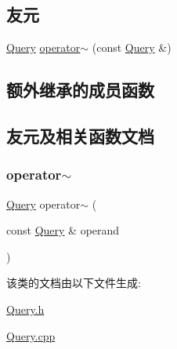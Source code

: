 \subsection*{友元}
\begin{DoxyCompactItemize}
\item 
\hyperlink{classQuery}{Query} \hyperlink{classNotQuery_afa815c3d9f1296e687770014302bac9a}{operator$\sim$} (const \hyperlink{classQuery}{Query} \&)
\end{DoxyCompactItemize}
\subsection*{额外继承的成员函数}


\subsection{友元及相关函数文档}
\mbox{\label{classNotQuery_afa815c3d9f1296e687770014302bac9a}} 
\subsubsection{\texorpdfstring{operator$\sim$}{operator~}}
{\footnotesize\ttfamily \hyperlink{classQuery}{Query} operator$\sim$ (\begin{DoxyParamCaption}\item[{const \hyperlink{classQuery}{Query} \&}]{operand }\end{DoxyParamCaption})\hspace{0.3cm}{\ttfamily [friend]}}



该类的文档由以下文件生成\+:\begin{DoxyCompactItemize}
\item 
\hyperlink{Query_8h}{Query.\+h}\item 
\hyperlink{Query_8cpp}{Query.\+cpp}\end{DoxyCompactItemize}
